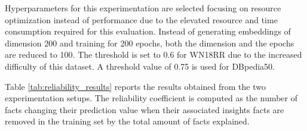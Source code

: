 \begin{table}[t]
\caption{Reliability results on DistMult on WN18RR and TransH on DBpedia50. The number of rules, correlations, and influential facts per experiment are also reported.}\label{tab:reliability_results}
\end{table}

Hyperparameters for this experimentation are selected focusing on resource optimization instead of performance due to the elevated resource and time consumption required for this evaluation. Instead of generating embeddings of dimension 200 and training for 200 epochs, both the dimension and the epochs are reduced to 100. The threshold is set to 0.6 for WN18RR due to the increased difficulty of this dataset. A threshold value of 0.75 is used for DBpedia50. 

Table \ref{tab:reliability_results} reports the results obtained from the two experimentation setups. The reliability coefficient is computed as the number of facts changing their prediction value when their associated insights facts are removed in the training set by the total amount of facts explained.

